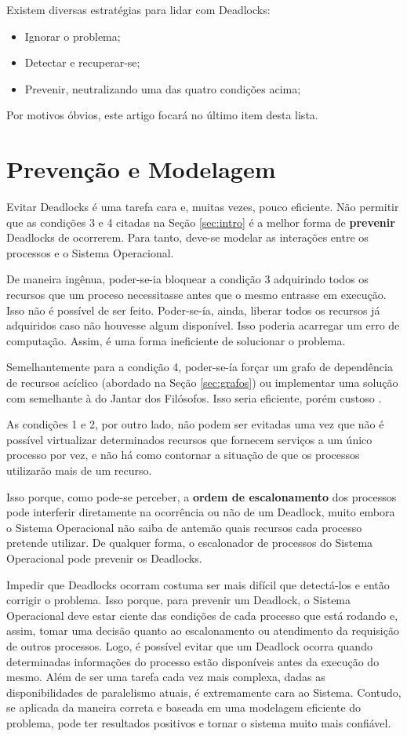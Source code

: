	Existem diversas estratégias para lidar com Deadlocks:
	\begin{itemize}
		\item Ignorar o problema;
		\item Detectar e recuperar-se;
		\item Prevenir, neutralizando uma das quatro condições acima;
	\end{itemize}

	Por motivos óbvios, este artigo focará no último item desta lista.

	\section{Prevenção e Modelagem}\label{sec:prevmod}
	Evitar Deadlocks é uma tarefa cara e, muitas vezes, pouco eficiente. Não permitir que as condições 3 e 4 citadas na Seção \ref{sec:intro} é a melhor forma de \textbf{prevenir} Deadlocks de ocorrerem. Para tanto, deve-se modelar as interações entre os processos e o Sistema Operacional.

	De maneira ingênua, poder-se-ia bloquear a condição 3 adquirindo todos os recursos que um proceso necessitasse antes que o mesmo entrasse em execução. Isso não é possível de ser feito. Poder-se-ía, ainda, liberar todos os recursos já adquiridos caso não houvesse algum disponível. Isso poderia acarregar um erro de computação. Assim, é uma forma ineficiente de solucionar o problema.

	Semelhantemente para a condição 4, poder-se-ía forçar um grafo de dependência de recursos acíclico (abordado na Seção \ref{sec:grafos}) ou implementar uma solução com semelhante à do Jantar dos Filósofos. Isso seria eficiente, porém custoso \cite{ufmg}.

	As condições 1 e 2, por outro lado, não podem ser evitadas uma vez que não é possível virtualizar determinados recursos que fornecem serviços a um único processo por vez, e não há como contornar a situação de que os processos utilizarão mais de um recurso.

	Isso porque, como pode-se perceber, a \textbf{ordem de escalonamento} dos processos pode interferir diretamente na ocorrência ou não de um Deadlock, muito embora o Sistema Operacional não saiba de antemão quais recursos cada processo pretende utilizar. De qualquer forma, o escalonador de processos do Sistema Operacional pode prevenir os Deadlocks.

	Impedir que Deadlocks ocorram costuma ser mais difícil que detectá-los e então corrigir o problema. Isso porque, para prevenir um Deadlock, o Sistema Operacional deve estar ciente das condições de cada processo que está rodando e, assim, tomar uma decisão quanto ao escalonamento ou atendimento da requisição de outros processos. Logo, é possível evitar que um Deadlock ocorra quando determinadas informações do processo estão disponíveis antes da execução do mesmo. Além de ser uma tarefa cada vez mais complexa, dadas as disponibilidades de paralelismo atuais, é extremamente cara ao Sistema. Contudo, se aplicada da maneira correta e baseada em uma modelagem eficiente do problema, pode ter resultados positivos e tornar o sistema muito mais confiável.

